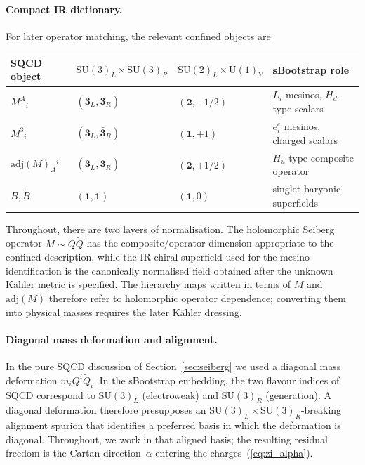 \documentclass[11pt,a4paper]{article}
\newcommand{\SU}{\mathrm{SU}}
\newcommand{\UU}{\mathrm{U}}
\newcommand{\adj}{\mathrm{adj}}
\begin{document}
\paragraph{Compact IR dictionary.}
For later operator matching, the relevant confined objects are
\begin{center}
\small
\begin{tabular}{@{}llll@{}}
  \toprule
  SQCD object & $\SU(3)_L\times\SU(3)_R$ & $\SU(2)_L\times\UU(1)_Y$ & sBootstrap role \\
  \midrule
  $M^A{}_i$ & $(\mathbf{3}_L,\bar{\mathbf{3}}_R)$ & $(\mathbf{2},-1/2)$ & $L_i$ mesinos, $H_d$-type scalars \\
  $M^3{}_i$ & $(\mathbf{3}_L,\bar{\mathbf{3}}_R)$ & $(\mathbf{1},+1)$ & $e^c_i$ mesinos, charged scalars \\
  $\adj(M)_A{}^{i}$ & $(\bar{\mathbf{3}}_L,\mathbf{3}_R)$ & $(\mathbf{2},+1/2)$ & $H_u$-type composite operator \\
  $B,\tilde B$ & $(\mathbf{1},\mathbf{1})$ & $(\mathbf{1},0)$ & singlet baryonic superfields \\
  \bottomrule
\end{tabular}
\end{center}
Throughout, there are two layers of normalisation.  The holomorphic Seiberg
operator $M\sim Q\tilde Q$ has the composite/operator dimension appropriate to
the confined description, while the IR chiral superfield used for the mesino
identification is the canonically normalised field obtained after the unknown
K\"ahler metric is specified.  The hierarchy maps written in terms of $M$ and
$\adj(M)$ therefore refer to holomorphic operator dependence; converting them
into physical masses requires the later K\"ahler dressing.

\paragraph{Diagonal mass deformation and alignment.}
In the pure SQCD discussion of Section~\ref{sec:seiberg} we used a diagonal
mass deformation $m_i Q^i\tilde Q_i$.  In the sBootstrap embedding, the two
flavour indices of SQCD correspond to $\SU(3)_L$ (electroweak) and $\SU(3)_R$
(generation).  A diagonal deformation therefore presupposes an
$\SU(3)_L\times\SU(3)_R$-breaking alignment spurion that identifies a preferred
basis in which the deformation is diagonal.  Throughout, we work in that
aligned basis; the resulting residual freedom is the Cartan direction~$\alpha$
entering the charges~(\ref{eq:zi_alpha}).
\end{document}
